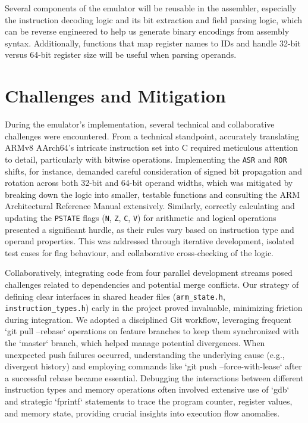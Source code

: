 \documentclass[11pt,a4paper]{article} %
\begin{document}
Several components of the emulator will be reusable in the assembler, especially the instruction decoding logic and its bit extraction and field parsing logic, which can be reverse engineered to help us generate binary encodings from assembly syntax. Additionally, functions that map register names to IDs and handle 32-bit versus 64-bit register size will be useful when parsing operands.

\section{Challenges and Mitigation}
\label{sec:challenges}
During the emulator's implementation, several technical and collaborative challenges were encountered. From a technical standpoint, accurately translating ARMv8 AArch64's intricate instruction set into C required meticulous attention to detail, particularly with bitwise operations. Implementing the \texttt{ASR} and \texttt{ROR} shifts, for instance, demanded careful consideration of signed bit propagation and rotation across both 32-bit and 64-bit operand widths, which was mitigated by breaking down the logic into smaller, testable functions and consulting the ARM Architectural Reference Manual extensively. Similarly, correctly calculating and updating the \texttt{PSTATE} flags (\texttt{N}, \texttt{Z}, \texttt{C}, \texttt{V}) for arithmetic and logical operations presented a significant hurdle, as their rules vary based on instruction type and operand properties. This was addressed through iterative development, isolated test cases for flag behaviour, and collaborative cross-checking of the logic.

Collaboratively, integrating code from four parallel development streams posed challenges related to dependencies and potential merge conflicts. Our strategy of defining clear interfaces in shared header files (\texttt{arm\_state.h}, \texttt{instruction\_types.h}) early in the project proved invaluable, minimizing friction during integration. We adopted a disciplined Git workflow, leveraging frequent `git pull --rebase` operations on feature branches to keep them synchronized with the `master` branch, which helped manage potential divergences. When unexpected push failures occurred, understanding the underlying cause (e.g., divergent history) and employing commands like `git push --force-with-lease` after a successful rebase became essential. Debugging the interactions between different instruction types and memory operations often involved extensive use of `gdb` and strategic `fprintf` statements to trace the program counter, register values, and memory state, providing crucial insights into execution flow anomalies.
\end{document}
